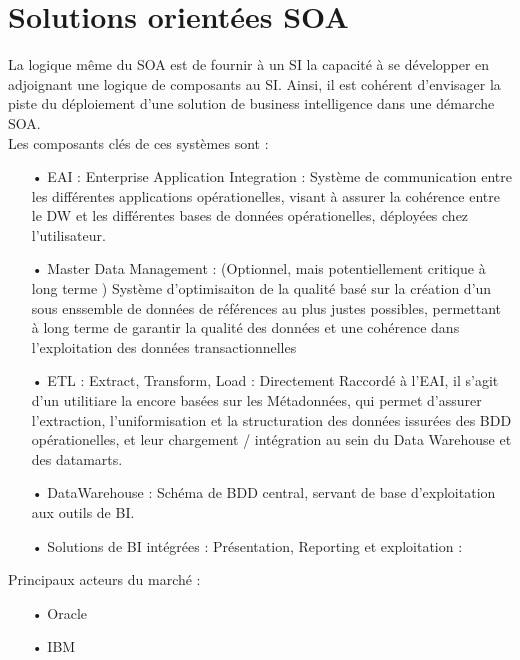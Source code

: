 \section{Solutions orientées SOA}
La logique même du SOA est de fournir à un SI la capacité à se développer en adjoignant une logique de composants au SI. Ainsi, il est cohérent d’envisager la piste du déploiement d’une solution de business intelligence dans une démarche SOA.\\
Les composants clés de ces systèmes sont :
\begin{itemize}
\item[•]EAI : Enterprise Application Integration  : Système de communication entre les différentes applications opérationelles, visant à assurer la cohérence entre le DW et les différentes bases de données opérationelles, déployées chez l’utilisateur.
\item[•]Master Data Management :  (Optionnel, mais potentiellement critique à long terme )  Système d’optimisaiton de la qualité basé sur la création d’un sous enssemble de données de références au plus justes possibles, permettant à long terme de garantir la qualité des données et une cohérence dans l’exploitation des données transactionnelles
\item[•]ETL : Extract, Transform, Load : Directement Raccordé à l’EAI, il s’agit d’un utilitiare la encore basées sur les Métadonnées, qui permet d’assurer l’extraction, l’uniformisation et la structuration des données issurées des BDD opérationelles, et leur chargement  / intégration au sein du Data Warehouse et des datamarts.
\item[•] DataWarehouse  : Schéma de BDD central, servant de base d’exploitation aux outils de  BI.
\item[•] Solutions de BI intégrées : Présentation, Reporting et exploitation : 
\end{itemize}
Principaux acteurs du marché :
\begin{itemize}
\item[•]Oracle
\item[•]IBM
\end{itemize}  